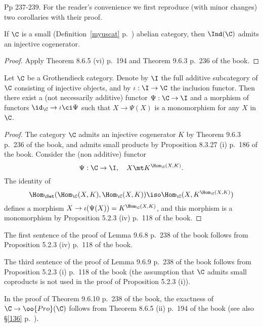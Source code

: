 \documentclass[12pt]{article}
\theoremstyle{remark}
\theoremstyle{definition}
\begin{document}
\begin{s}
Pp 237-239. For the reader's convenience we first reproduce (with minor changes) two corollaries with their proof. 

\begin{cor}[Corollary 9.6.5 p. 237]
If $\C$ is a small (Definition~\ref{myuscat} p.~) abelian category, then $\Ind(\C)$ admits an injective cogenerator.
\end{cor}

\begin{proof}
Apply Theorem 8.6.5 (vi) p.~194 and Theorem 9.6.3 p.~236 of the book.
\end{proof}

\begin{cor}[Corollary 9.6.6 p. 237]
Let $\C$ be a Grothendieck category. Denote by $\I$ the full additive subcategory of $\C$ consisting of injective objects, and by $\iota:\I\to\C$ the inclusion functor. Then there exist a (not necessarily additive) functor $\Psi:\C\to\I$ and a morphism of functors $\id_\C\to\iota\ci\Psi$ such that $X\to\Psi(X)$ is a monomorphism for any $X$ in $\C$.
\end{cor}

\begin{proof}
The category $\C$ admits an injective cogenerator $K$ by Theorem 9.6.3 p.~236 of the book, and admits small products by Proposition 8.3.27 (i) p.~186 of the book. Consider the (non additive) functor 
$$
\Psi:\C\to\I,\quad X\mt K^{\Hom_\C(X,K)}.
$$ 
The identity of 
$$
\Hom_{\Set}(\Hom_\C(X,K),\Hom_\C(X,K))\iso\Hom_\C(X,K^{\Hom_\C(X,K)})
$$ 
defines a morphism $X\to\iota(\Psi(X))=K^{\Hom_\C(X,K)}$, and this morphism is a monomorphism by Proposition 5.2.3 (iv) p.~118 of the book. 
\end{proof}


The first sentence of the proof of Lemma 9.6.8 p.~238 of the book follows from Proposition 5.2.3 (iv) p.~118 of the book. 

The third sentence of the proof of Lemma 9.6.9 p.~238 of the book follows from Proposition 5.2.3 (i) p.~118 of the book (the assumption that $\C$ admits small coproducts is not used in the proof of Proposition 5.2.3 (i)).


In the proof of Theorem 9.6.10 p.~238 of the book, the exactness of $\C\to\oo{Pro}(\C)$ follows from Theorem 8.6.5 (ii) p.~194 of the book (see also \S\ref{136} p.~).
\end{s}
\end{document}
